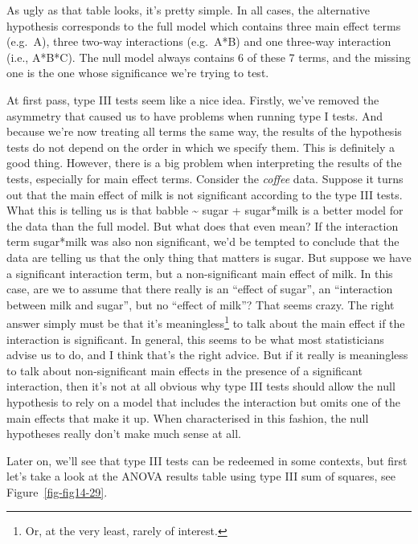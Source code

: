 \documentclass[
  a4paper,
]{book}
\begin{document}
As ugly as that table looks, it's pretty simple. In all cases, the
alternative hypothesis corresponds to the full model which contains
three main effect terms (e.g.~A), three two-way interactions (e.g.~A*B)
and one three-way interaction (i.e., A*B*C). The null model always
contains 6 of these 7 terms, and the missing one is the one whose
significance we're trying to test.

At first pass, type III tests seem like a nice idea. Firstly, we've
removed the asymmetry that caused us to have problems when running type
I tests. And because we're now treating all terms the same way, the
results of the hypothesis tests do not depend on the order in which we
specify them. This is definitely a good thing. However, there is a big
problem when interpreting the results of the tests, especially for main
effect terms. Consider the \emph{coffee} data. Suppose it turns out that
the main effect of milk is not significant according to the type III
tests. What this is telling us is that babble \textasciitilde{} sugar +
sugar*milk is a better model for the data than the full model. But what
does that even mean? If the interaction term sugar*milk was also non
significant, we'd be tempted to conclude that the data are telling us
that the only thing that matters is sugar. But suppose we have a
significant interaction term, but a non-significant main effect of milk.
In this case, are we to assume that there really is an ``effect of
sugar'', an ``interaction between milk and sugar'', but no ``effect of
milk''? That seems crazy. The right answer simply must be that it's
meaningless\footnote{Or, at the very least, rarely of interest.} to talk
about the main effect if the interaction is significant. In general,
this seems to be what most statisticians advise us to do, and I think
that's the right advice. But if it really is meaningless to talk about
non-significant main effects in the presence of a significant
interaction, then it's not at all obvious why type III tests should
allow the null hypothesis to rely on a model that includes the
interaction but omits one of the main effects that make it up. When
characterised in this fashion, the null hypotheses really don't make
much sense at all.

Later on, we'll see that type III tests can be redeemed in some
contexts, but first let's take a look at the ANOVA results table using
type III sum of squares, see Figure~\ref{fig-fig14-29}.
\end{document}
